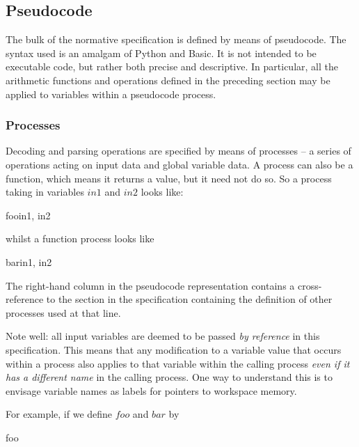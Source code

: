 \subsection{Pseudocode}
\label{pseudocode}

The bulk of the normative specification is defined by means of pseudocode. 
The syntax used is an amalgam of Python and Basic. It is not intended
to be executable code, but rather both precise and descriptive. 
In particular, all the arithmetic functions and
operations defined in the preceding section may be applied to variables within
a pseudocode process.

\subsubsection{Processes}
\label{functionsprocesses}

Decoding and parsing operations are specified by means of processes
 -- a series of operations acting on input data and global variable data. 
A process can also be a function, which means it returns a value, but
it need not do so. So a process
taking in variables $in1$ and $in2$ looks like:

\begin{pseudo}{foo}{in1, in2}
\bsCODE{\hdots}
\end{pseudo}

whilst a function process looks like

\begin{pseudo}{bar}{in1, in2}
\bsCODE{\hdots}
\end{pseudo}

The right-hand column in the pseudocode representation contains a cross-reference to the 
section in the specification containing the definition of other processes used at that line.

Note well: all input variables are deemed to be passed {\em by reference} in this
specification. This means that any modification to a variable value that
occurs within a process also applies to that variable within the calling process
{\em even if it has a different name} in the calling process. One way to understand
this is to envisage variable names as labels for pointers to workspace memory.

For example, if we define $foo$ and $bar$ by

\begin{pseudo}{foo}{}
\end{pseudo}

